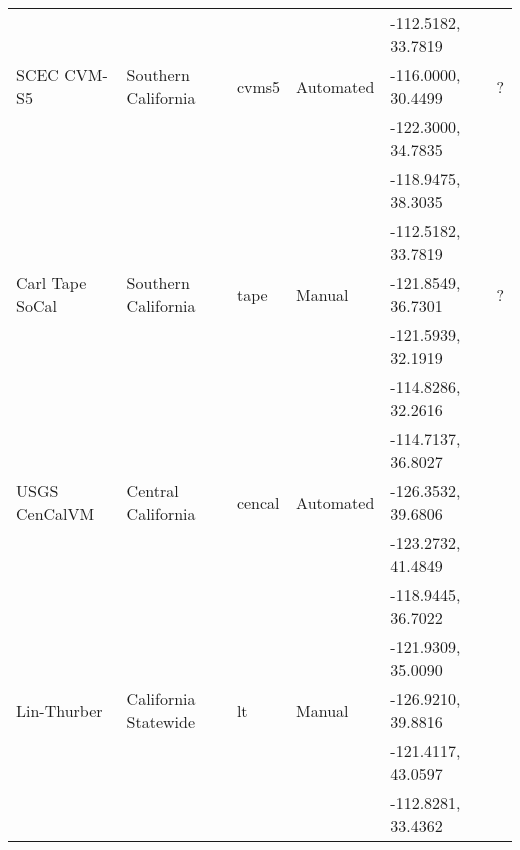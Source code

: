 \begin{table*}[ht!]
\begin{tabular}[]{lllllp{1.25in}}
                   &                       &               &              & -112.5182, 33.7819 &                              \\
SCEC CVM-S5        & Southern California   & cvms5         &  Automated   & -116.0000, 30.4499 & ?                            \\
                   &                       &               &              & -122.3000, 34.7835 &                              \\
                   &                       &               &              & -118.9475, 38.3035 &                              \\
                   &                       &               &              & -112.5182, 33.7819 &                              \\
Carl Tape SoCal    & Southern California   & tape          &  Manual      & -121.8549, 36.7301 & ?	                          \\
                   &                       &               &              & -121.5939, 32.1919 &                              \\
                   &                       &               &              & -114.8286, 32.2616 &                              \\
                   &                       &               &              & -114.7137, 36.8027 &                              \\
USGS CenCalVM      & Central California    & cencal        &  Automated   & -126.3532, 39.6806 & \citet{Brocher_2005_Tech}    \\
                   &                       &               &              & -123.2732, 41.4849 & \citet{Brocher_2006_Proc}    \\
                   &                       &               &              & -118.9445, 36.7022 &                              \\
                   &                       &               &              & -121.9309, 35.0090 &                              \\
Lin-Thurber        & California Statewide  & lt            &  Manual      & -126.9210, 39.8816 & \citet{Lin_2010_BSSA}        \\
                   &                       &               &              & -121.4117, 43.0597 &                              \\
                   &                       &               &              & -112.8281, 33.4362 &                              \\

\end{tabular}
\end{table*}

